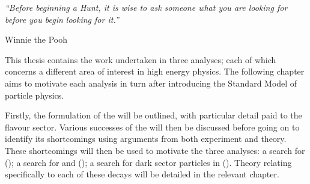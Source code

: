 
\begin{minipage}{\textwidth}
  {\it ``Before beginning a Hunt, it is wise to ask someone what you are looking for before you
  begin looking for it.''}

  {\hfill Winnie the Pooh}
\end{minipage}

\vspace{2em}

This thesis contains the work undertaken in three analyses; each of which concerns a different area
of interest in high energy physics.
The following chapter aims to motivate each analysis in turn after introducing the Standard Model
of particle physics.

Firstly, the formulation of the \sm will be outlined, with particular detail paid to the flavour
sector.
Various successes of the \sm will then be discussed before going on to identify its shortcomings
using arguments from both experiment and theory.
These shortcomings will then be used to motivate the three analyses:
a search for \btodsphi ();
a search for \btokpipimumu and \btophikmumu ();
a search for dark sector particles in \btokstmumu ().
Theory relating specifically to each of these decays will be detailed in the relevant chapter.


